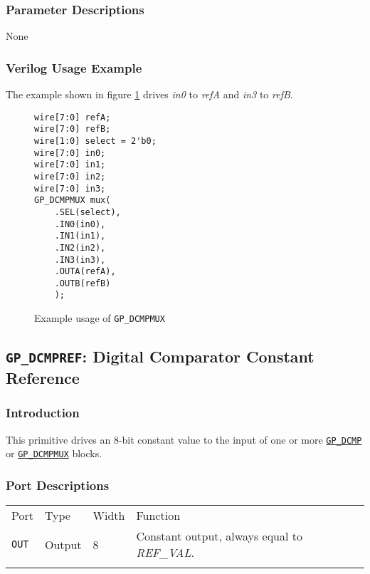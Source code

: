 \documentclass[11pt]{article}
\newcommand{\namestyle}[1]{\textit{#1}}
\newcommand{\tokenstyle}[1]{\texttt{#1}}
\newcommand{\whenstyle}[1]{{\fontseries{sb}\selectfont#1}}
\newcommand{\tokenref}[2]{\hyperref[#2]{\tokenstyle{#1}}}
\newcommand{\thinhline}{\Xhline{1\arrayrulewidth}}
\newcommand{\thickhline}{\Xhline{2.5\arrayrulewidth}}
\begin{document}
\subsubsection{Parameter Descriptions}

None

\subsubsection{Verilog Usage Example}

The example shown in figure \ref{gp-dcmpmux-example} drives \namestyle{in0} to \namestyle{refA} and \namestyle{in3} to
\namestyle{refB}.

\begin{figure}[h]
\begin{lstlisting}
wire[7:0] refA;
wire[7:0] refB;
wire[1:0] select = 2'b0;
wire[7:0] in0;
wire[7:0] in1;
wire[7:0] in2;
wire[7:0] in3;
GP_DCMPMUX mux(
	.SEL(select),
	.IN0(in0),
	.IN1(in1),
	.IN2(in2),
	.IN3(in3),
	.OUTA(refA),
	.OUTB(refB)
	);
\end{lstlisting}
\caption{Example usage of \tokenstyle{GP\_DCMPMUX}}
\label{gp-dcmpmux-example}
\end{figure}


\pagebreak
\subsection{\tokenstyle{GP\_DCMPREF}: Digital Comparator Constant Reference}
\label{gp-dcmpref}

\subsubsection{Introduction}

This primitive drives an 8-bit constant value to the input of one or more \tokenref{GP\_DCMP}{gp-dcmp} or
\tokenref{GP\_DCMPMUX}{gp-dcmpmux} blocks.

\subsubsection{Port Descriptions}

\begin{tabularx}{\textwidth}{lllX}
\thinhline
\whenstyle{Port} & \whenstyle{Type} & \whenstyle{Width} & \whenstyle{Function} \\
\thickhline
\tokenstyle{OUT} & Output & 8 & Constant output, always equal to \namestyle{REF\_VAL}. \\
\thinhline
\end{tabularx}
\end{document}
